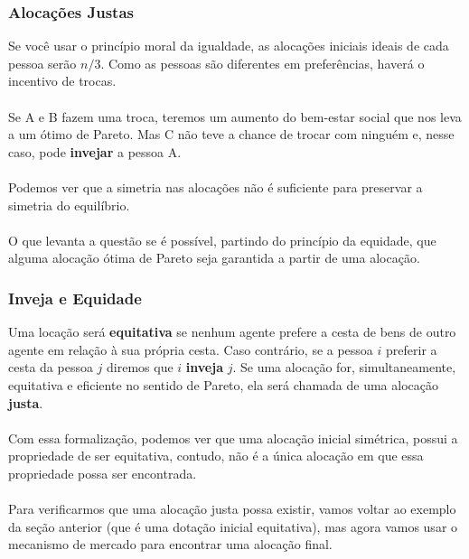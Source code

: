 \documentclass{beamer}[10]
\begin{document}
\begin{frame}
	\frametitle{Alocações Justas}

	Se você usar o princípio moral da igualdade, as alocações iniciais ideais de cada pessoa serão $n/3$. Como as pessoas são diferentes em preferências, haverá o incentivo de trocas.
	\\~\\
	Se A e B fazem uma troca, teremos um aumento do bem-estar social que nos leva a um ótimo de Pareto. Mas C não teve a chance de trocar com ninguém e, nesse caso, pode \textbf{invejar} a pessoa A.
	\\~\\
	Podemos ver que a simetria nas alocações não é suficiente para preservar a simetria do equilíbrio.
	\\~\\
	O que levanta a questão se é possível, partindo do princípio da equidade, que alguma alocação ótima de Pareto seja garantida a partir de uma alocação.

\end{frame}

\begin{frame}
	\frametitle{Inveja e Equidade}

	Uma locação será \textbf{equitativa} se nenhum agente prefere a cesta de bens de outro agente em relação à sua própria cesta. Caso contrário, se a pessoa $i$ preferir a cesta da pessoa $j$ diremos que $i$ \textbf{inveja} $j$. Se uma alocação for, simultaneamente, equitativa e eficiente no sentido de Pareto, ela será chamada de uma alocação \textbf{justa}.
	\\~\\
	Com essa formalização, podemos ver que uma alocação inicial simétrica, possui a propriedade de ser equitativa, contudo, não é a única alocação em que essa propriedade possa ser encontrada.
	\\~\\
	Para verificarmos que uma alocação justa possa existir, vamos voltar ao exemplo da seção anterior (que é uma dotação inicial equitativa), mas agora vamos usar o mecanismo de mercado para encontrar uma alocação final.
	

\end{frame}
\end{document}
